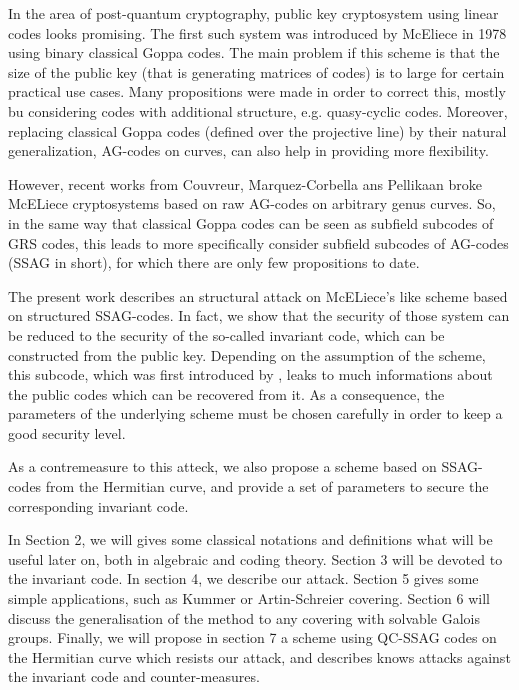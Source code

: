 \documentclass[10pt]{article}
\newcommand{\s}{\vspace{0.3cm}}
\begin{document}
\s
In the area of post-quantum cryptography, public key cryptosystem using linear codes looks promising. The first such system was introduced by McEliece in 1978 \cite{McE} using binary classical Goppa codes. The main problem if this scheme is that the size of the public key (that is generating matrices of codes) is to large for certain practical use cases. Many propositions were made in order to correct this, mostly bu considering codes with additional structure, e.g. quasy-cyclic codes. Moreover, replacing classical Goppa codes (defined over the projective line) by their natural generalization, AG-codes on curves, can also help in providing more flexibility. 

\s

However, recent works from Couvreur, Marquez-Corbella ans Pellikaan \cite{CMP} broke McELiece cryptosystems based on raw AG-codes on arbitrary genus curves. So, in the same way that classical Goppa codes can be seen as subfield subcodes of GRS codes, this leads to more specifically consider subfield subcodes of AG-codes (SSAG in short), for which there are only few propositions to date.

\s

The present work describes an structural attack on McELiece's like scheme based on structured SSAG-codes. In fact, we show that the security of those system can be reduced to the security of the so-called invariant code, which can be constructed from the public key. Depending on the assumption of the scheme, this subcode, which was first introduced by \cite{LOI}, leaks to much informations about the public codes which can be recovered from it. As a consequence, the parameters of the underlying scheme must be chosen carefully in order to keep a good security level.

\s

As a contremeasure to this atteck, we also propose a scheme based on SSAG-codes from the Hermitian curve, and provide a set of parameters to secure the corresponding invariant code.   

\s

In Section 2, we will gives some classical notations and definitions what will be useful later on, both in algebraic and coding theory. Section 3 will be devoted to the invariant code. In section 4, we describe our attack. Section 5 gives some simple applications, such as Kummer or Artin-Schreier covering. Section 6 will discuss the generalisation of the method to any covering with solvable Galois groups. Finally, we will propose in section 7 a scheme using QC-SSAG codes on the Hermitian curve which resists our attack, and describes knows attacks against the invariant code and counter-measures.
\end{document}
